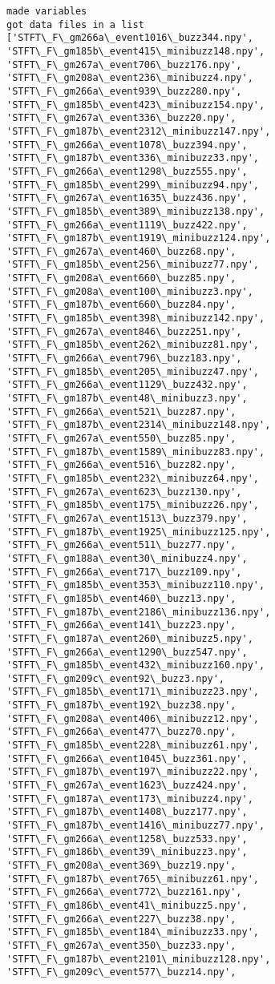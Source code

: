 \documentclass[11pt]{article}
\begin{document}
    \begin{Verbatim}[commandchars=\\\{\}]
made variables
got data files in a list
['STFT\_F\_gm266a\_event1016\_buzz344.npy', 'STFT\_F\_gm185b\_event415\_minibuzz148.npy', 'STFT\_F\_gm267a\_event706\_buzz176.npy', 'STFT\_F\_gm208a\_event236\_minibuzz4.npy', 'STFT\_F\_gm266a\_event939\_buzz280.npy', 'STFT\_F\_gm185b\_event423\_minibuzz154.npy', 'STFT\_F\_gm267a\_event336\_buzz20.npy', 'STFT\_F\_gm187b\_event2312\_minibuzz147.npy', 'STFT\_F\_gm266a\_event1078\_buzz394.npy', 'STFT\_F\_gm187b\_event336\_minibuzz33.npy', 'STFT\_F\_gm266a\_event1298\_buzz555.npy', 'STFT\_F\_gm185b\_event299\_minibuzz94.npy', 'STFT\_F\_gm267a\_event1635\_buzz436.npy', 'STFT\_F\_gm185b\_event389\_minibuzz138.npy', 'STFT\_F\_gm266a\_event1119\_buzz422.npy', 'STFT\_F\_gm187b\_event1919\_minibuzz124.npy', 'STFT\_F\_gm267a\_event460\_buzz68.npy', 'STFT\_F\_gm185b\_event256\_minibuzz77.npy', 'STFT\_F\_gm208a\_event660\_buzz85.npy', 'STFT\_F\_gm208a\_event100\_minibuzz3.npy', 'STFT\_F\_gm187b\_event660\_buzz84.npy', 'STFT\_F\_gm185b\_event398\_minibuzz142.npy', 'STFT\_F\_gm267a\_event846\_buzz251.npy', 'STFT\_F\_gm185b\_event262\_minibuzz81.npy', 'STFT\_F\_gm266a\_event796\_buzz183.npy', 'STFT\_F\_gm185b\_event205\_minibuzz47.npy', 'STFT\_F\_gm266a\_event1129\_buzz432.npy', 'STFT\_F\_gm187b\_event48\_minibuzz3.npy', 'STFT\_F\_gm266a\_event521\_buzz87.npy', 'STFT\_F\_gm187b\_event2314\_minibuzz148.npy', 'STFT\_F\_gm267a\_event550\_buzz85.npy', 'STFT\_F\_gm187b\_event1589\_minibuzz83.npy', 'STFT\_F\_gm266a\_event516\_buzz82.npy', 'STFT\_F\_gm185b\_event232\_minibuzz64.npy', 'STFT\_F\_gm267a\_event623\_buzz130.npy', 'STFT\_F\_gm185b\_event175\_minibuzz26.npy', 'STFT\_F\_gm267a\_event1513\_buzz379.npy', 'STFT\_F\_gm187b\_event1925\_minibuzz125.npy', 'STFT\_F\_gm266a\_event511\_buzz77.npy', 'STFT\_F\_gm188a\_event30\_minibuzz4.npy', 'STFT\_F\_gm266a\_event717\_buzz109.npy', 'STFT\_F\_gm185b\_event353\_minibuzz110.npy', 'STFT\_F\_gm185b\_event460\_buzz13.npy', 'STFT\_F\_gm187b\_event2186\_minibuzz136.npy', 'STFT\_F\_gm266a\_event141\_buzz23.npy', 'STFT\_F\_gm187a\_event260\_minibuzz5.npy', 'STFT\_F\_gm266a\_event1290\_buzz547.npy', 'STFT\_F\_gm185b\_event432\_minibuzz160.npy', 'STFT\_F\_gm209c\_event92\_buzz3.npy', 'STFT\_F\_gm185b\_event171\_minibuzz23.npy', 'STFT\_F\_gm187b\_event192\_buzz38.npy', 'STFT\_F\_gm208a\_event406\_minibuzz12.npy', 'STFT\_F\_gm266a\_event477\_buzz70.npy', 'STFT\_F\_gm185b\_event228\_minibuzz61.npy', 'STFT\_F\_gm266a\_event1045\_buzz361.npy', 'STFT\_F\_gm187b\_event197\_minibuzz22.npy', 'STFT\_F\_gm267a\_event1623\_buzz424.npy', 'STFT\_F\_gm187a\_event173\_minibuzz4.npy', 'STFT\_F\_gm187b\_event1408\_buzz177.npy', 'STFT\_F\_gm187b\_event1416\_minibuzz77.npy', 'STFT\_F\_gm266a\_event1258\_buzz533.npy', 'STFT\_F\_gm186b\_event39\_minibuzz3.npy', 'STFT\_F\_gm208a\_event369\_buzz19.npy', 'STFT\_F\_gm187b\_event765\_minibuzz61.npy', 'STFT\_F\_gm266a\_event772\_buzz161.npy', 'STFT\_F\_gm186b\_event41\_minibuzz5.npy', 'STFT\_F\_gm266a\_event227\_buzz38.npy', 'STFT\_F\_gm185b\_event184\_minibuzz33.npy', 'STFT\_F\_gm267a\_event350\_buzz33.npy', 'STFT\_F\_gm187b\_event2101\_minibuzz128.npy', 'STFT\_F\_gm209c\_event577\_buzz14.npy', 
\end{Verbatim}
\end{document}
